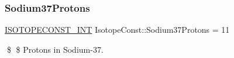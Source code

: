 \subsubsection{\texorpdfstring{Sodium37\+Protons}{Sodium37Protons}}
{\footnotesize\ttfamily \mbox{\hyperlink{group___isotope_const-_macros_ga5f18360b3e99483a35c32d789e62621c}{I\+S\+O\+T\+O\+P\+E\+C\+O\+N\+S\+T\+\_\+\+I\+NT}} Isotope\+Const\+::\+Sodium37\+Protons = 11}

\$ \$ Protons in Sodium-\/37. 